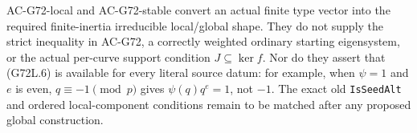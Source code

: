 \begin{remark}
AC-G72-local and AC-G72-stable convert an actual finite type
vector into the required finite-inertia irreducible local/global
shape.  They do not supply the strict inequality in AC-G72,
a correctly weighted ordinary starting eigensystem, or the
actual per-curve support condition $J\subseteq\ker f$.
Nor do they assert that (G72L.6) is available for every literal
source datum: for example, when $\psi=1$ and $e$ is even,
$q\equiv-1\pmod p$ gives $\psi(q)q^e=1$, not $-1$.
The exact old \texttt{IsSeedAlt} and ordered local-component
conditions remain to be matched after any proposed global
construction.
\end{remark}
